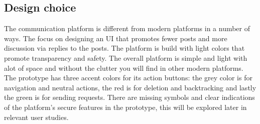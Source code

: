 \subsection{Design choice}
The communication platform is different from modern platforms in a number of ways. The focus on designing an UI that promotes fewer posts and more discussion via replies to the posts. The platform is build with light colors that promote transparency and safety. The overall platform is simple and light with alot of space and without the clutter you will find in other modern platforms. The prototype has three accent colors for its action buttons: the grey color is for navigation and neutral actions, the red is for deletion and backtracking and lastly the green is for sending requests. There are missing symbols and clear indications of the platform's secure features in the prototype, this will be explored later in relevant user studies.

